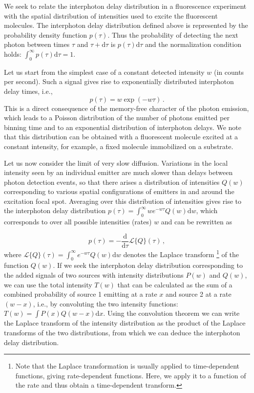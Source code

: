 We seek to relate the interphoton delay distribution in a fluorescence experiment with 
the spatial distribution of intensities used to excite the fluorescent molecules. The interphoton
delay distribution defined above is represented by the probability density function $p(\tau)$. 
Thus the probability of detecting the next photon between times $\tau$ and 
$\tau+\mbox{d}\tau$ is $p(\tau)\mbox{d}\tau$ and the
normalization condition holds: $\int_0^{\infty}{p(\tau)\mbox{d}\tau}=1$.

Let us start from the simplest case of a constant detected intensity $w$ 
(in counts per second). Such a signal gives rise to exponentially distributed 
interphoton delay times, i.e., 
\begin{equation}
p(\tau)=w\exp(-w\tau)\,.
\label{eq:exponential_distribution}
\end{equation}
This is a direct consequence of the memory-free character of the photon 
emission, which leads to a Poisson distribution of the number of photons 
emitted per binning time and to an 
exponential distribution of interphoton delays. We note that this distribution 
can be obtained with a fluorescent molecule excited at a constant intensity, 
for example, a fixed molecule immobilized on a substrate. 

Let us now consider the limit of very slow diffusion. Variations in the local 
intensity seen by an individual emitter are much slower than delays between 
photon detection events, so that there arises a distribution of intensities 
$Q(w)$ corresponding to various spatial configurations of emitters in and 
around the excitation focal spot.
Averaging over this distribution of intensities gives rise to the interphoton 
delay distribution $p(\tau)=\int_0^\infty w e^{-w\tau}Q(w)\mbox{d}w$, which 
corresponds to over all possible intensities (rates) $w$ and can be rewritten as

\begin{equation}
p(\tau)=-\frac{\mbox{d}}{\mbox{d}\tau}\mathscr{L}\{Q\}(\tau)\,,
\label{eq:interphoton_delay_distribution}
\end{equation} 
where $\mathscr{L}\{Q\}(\tau)=\int_0^\infty e^{-w\tau}Q(w)\mbox{d}w$ denotes the 
Laplace transform \footnote{Note that the Laplace transformation
is usually applied to time-dependent functions, giving rate-dependent functions. 
Here, we apply it to a function of the rate and thus obtain a time-dependent transform.} of the function $Q(w)$. 
If we seek the interphoton delay distribution 
corresponding to the added signals of two sources with intensity distributions $P(w)$ 
and $Q(w)$, we can use the total intensity $T(w)$ that can be calculated as the sum 
of a combined probability of source 1 emitting at a rate $x$ and source 2 at a rate 
$(w-x)$, i.e., by convoluting the two intensity functions: $T(w)=\int{P(x)Q(w-x)\mbox{d}x}$. 
Using the convolution theorem we can write the Laplace transform of the intensity distribution 
as the product of the Laplace transforms of the two distributions, from which we can deduce 
the interphoton delay distribution.

